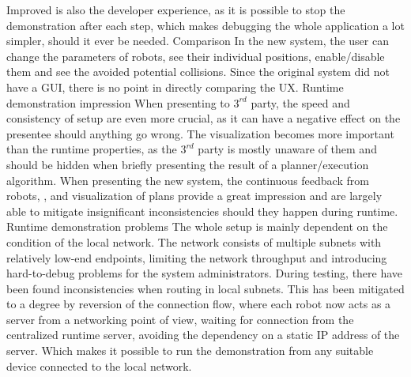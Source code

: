 Improved is also the developer experience, as it is possible to stop the demonstration after each step, which makes debugging the whole application a lot simpler, should it ever be needed.
\secc Comparison
In the new system, the user can change the parameters of robots, see their individual positions, enable/disable them and see the avoided potential collisions. Since the original system did not have a GUI, there is no point in directly comparing the UX. 
\sec Runtime demonstration impression
When presenting to $3^{rd}$ party, the speed and consistency of setup are even more crucial, as it can have a negative effect on the presentee should anything go wrong. The visualization becomes more important than the runtime properties, as the $3^{rd}$ party is mostly unaware of them and should be hidden when briefly presenting the result of a planner/execution algorithm. When presenting the new system, the continuous feedback from robots, {\vicon}, and visualization of plans provide a great impression and are largely able to mitigate insignificant inconsistencies should they happen during runtime.
\sec Runtime demonstration problems
The whole setup is mainly dependent on the condition of the local network. The network consists of multiple subnets with relatively low-end endpoints, limiting the network throughput and introducing hard-to-debug problems for the system administrators. During testing, there have been found inconsistencies when routing in local subnets. This has been mitigated to a degree by reversion of the connection flow, where each robot now acts as a server from a networking point of view, waiting for connection from the centralized runtime server, avoiding the dependency on a static IP address of the server. Which makes it possible to run the demonstration from any suitable device connected to the local network.